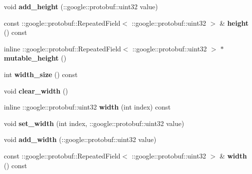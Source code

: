 \begin{DoxyCompactItemize}
\item 
\mbox{\label{classcaffe_1_1_dummy_data_parameter_a93c09f380b03fd8f45eea764fe6f5550}} 
void {\bfseries add\+\_\+height} (\+::google\+::protobuf\+::uint32 value)
\item 
\mbox{\label{classcaffe_1_1_dummy_data_parameter_abf258010246281699ddb3019940d39cb}} 
const \+::google\+::protobuf\+::\+Repeated\+Field$<$ \+::google\+::protobuf\+::uint32 $>$ \& {\bfseries height} () const
\item 
\mbox{\label{classcaffe_1_1_dummy_data_parameter_a7c07e36e794c7ebcfb1257dbc9b3dcac}} 
inline \+::google\+::protobuf\+::\+Repeated\+Field$<$ \+::google\+::protobuf\+::uint32 $>$ $\ast$ {\bfseries mutable\+\_\+height} ()
\item 
\mbox{\label{classcaffe_1_1_dummy_data_parameter_a5c1cf9561a02ad73cc6ba552447945e2}} 
int {\bfseries width\+\_\+size} () const
\item 
\mbox{\label{classcaffe_1_1_dummy_data_parameter_a978a99d9b5ffaa073acdea99c9b41ecb}} 
void {\bfseries clear\+\_\+width} ()
\item 
\mbox{\label{classcaffe_1_1_dummy_data_parameter_a46f9a34e5926c06757f4fb7255311c00}} 
inline \+::google\+::protobuf\+::uint32 {\bfseries width} (int index) const
\item 
\mbox{\label{classcaffe_1_1_dummy_data_parameter_a6a4a3e7bdebaf156aee4327ce7ae18f3}} 
void {\bfseries set\+\_\+width} (int index, \+::google\+::protobuf\+::uint32 value)
\item 
\mbox{\label{classcaffe_1_1_dummy_data_parameter_aadaa71a20fc19722a34c33e57b681bea}} 
void {\bfseries add\+\_\+width} (\+::google\+::protobuf\+::uint32 value)
\item 
\mbox{\label{classcaffe_1_1_dummy_data_parameter_ac9c9f9b298d2085abb6fe7e5c7f704c8}} 
const \+::google\+::protobuf\+::\+Repeated\+Field$<$ \+::google\+::protobuf\+::uint32 $>$ \& {\bfseries width} () const

\end{DoxyCompactItemize}
